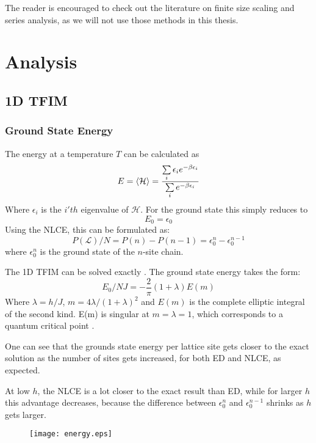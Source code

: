 \documentclass{article}
\begin{document}
The reader is encouraged to check out the literature on finite size
scaling and series analysis, as we will not use those methods in this thesis.

\section{Analysis}
\subsection{1D TFIM}
\subsubsection{Ground State Energy}
The energy at a temperature $T$ can be calculated as
\begin{equation}
\label{eq:28}
E = \braket{\mathcal{H}} = \frac{\sum\limits_i \epsilon_i
  e^{-\beta \epsilon_i}}{\sum\limits_i e^{- \beta \epsilon_i}}
\end{equation}
Where $\epsilon_i$ is the $i'th$ eigenvalue of $\mathcal{H}$. For the
ground state this simply reduces to
\begin{equation}
\label{eq:29}
E_0 = \epsilon_0
\end{equation}
Using the NLCE, this can be formulated as:
\begin{equation}
\label{eq:30}
P(\mathcal{L})/N = P(n) - P(n-1) = \epsilon_0^n - \epsilon_0^{n-1}
\end{equation}
where $\epsilon_0^n$ is the ground state of the $n$-site chain.

The 1D TFIM can be solved exactly \cite{Pfeuty}. The ground state
energy takes the form:
\begin{equation}
\label{eq:22}
E_0/NJ = - \frac{2}{\pi} (1+ \lambda)E(m)
\end{equation}
Where $\lambda = h/J$, $m= 4\lambda /(1+\lambda)^2$ and $E(m)$ is the
complete elliptic integral of the second kind. E(m) is singular at $m
= \lambda = 1$, which corresponds to a quantum critical point
\cite{Series}.

One can see that the grounds state energy per lattice site gets closer
to the exact solution as the number of sites gets increased, for both
ED and NLCE, as expected.



At low $h$, the NLCE is a lot closer to the exact result than ED, while for larger $h$
this advantage decreases, because the difference between
$\epsilon_0^n$ and $\epsilon_0^{n-1}$ shrinks as $h$ gets larger.
\begin{figure}[htbp]
\centerline{\texttt{[image: energy.eps]}}
\caption[]{\label{fig:energy-ed-nlce} }
\end{figure}
\end{document}
